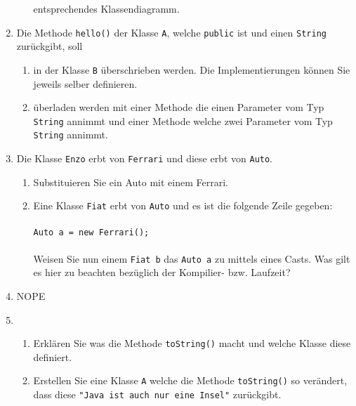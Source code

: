 \begin{enumerate}
\begin{enumerate}[label=(\alph*)]
                entsprechendes Klassendiagramm.
        \end{enumerate}
    \item Die Methode \verb?hello()? der Klasse \verb?A?, welche 
        \verb?public? ist und einen \verb?String? zurückgibt, soll 
        \begin{enumerate}[label=(\alph*)] 
            \item in der Klasse \verb?B? überschrieben werden. Die 
                Implementierungen können Sie jeweils selber definieren.
            \item überladen werden mit einer Methode die einen Parameter
                vom Typ \verb?String? annimmt und einer Methode welche
                zwei Parameter vom Typ \verb?String? annimmt.
        \end{enumerate}
    \item Die Klasse \verb?Enzo? erbt von \verb?Ferrari? und diese 
         erbt von \verb?Auto?.
        \begin{enumerate}[label=(\alph*)]
            \item Substituieren Sie ein Auto mit einem Ferrari.
            \item Eine Klasse \verb?Fiat? erbt von \verb?Auto? und es 
                ist die folgende Zeile gegeben: \\\\
                \verb?Auto a = new Ferrari();?\\\\
                Weisen Sie nun einem \verb?Fiat b? das \verb?Auto a? zu 
                mittels eines Casts. Was gilt es hier zu beachten bezüglich 
                der Kompilier- bzw. Laufzeit?
        \end{enumerate}
    \item NOPE
    \item 
        \begin{enumerate}[label=(\alph*)]
            \item Erklären Sie was die Methode \verb?toString()? macht 
                und welche Klasse diese definiert.
            \item Erstellen Sie eine Klasse \verb?A? welche die Methode
                \verb?toString()? so verändert, dass diese 
                \verb?"Java ist auch nur eine Insel"? zurückgibt.
        \end{enumerate}
\end{enumerate}
